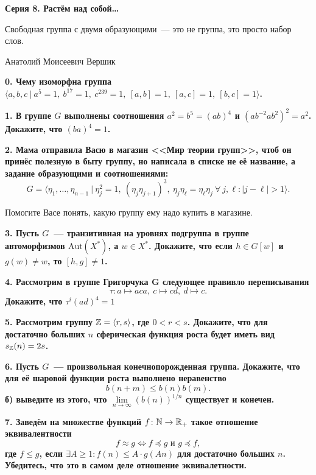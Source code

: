 \documentclass[12pt, oneside, dvipsnames]{extarticle}
\begin{document}
	\begin{center}
	\centerline{\bf{Серия 8.  Растём над собой\ldots }}
	\end{center}

	\epigraph{Свободная группа с двумя образующими~--- это не группа, это просто набор слов.}{Анатолий Моисеевич Вершик}

	\bf{0.} Чему изоморфна группа $\langle a, b, c \ \vert \ a^{5} = 1, \ b^{17} = 1, \ c^{239} = 1, \ [a, b] = 1, \ [a, c] = 1 , \ [b, c] = 1 \rangle$.

	\bf{1.} В группе $G$ выполнены соотношения $a^2 = b^5 = (ab)^4$ и $(a b^{-2} a b^2)^2 = a^2$. Докажите, что $(ba)^4 = 1$. 

	\bf{2.}  Мама отправила Васю в магазин <<Мир теории групп>>, чтоб он принёс полезную в быту группу, но написала в списке не её название, а задание образующими и соотношениями:
	\[
		G = \langle \eta_1, \ldots, \eta_{n - 1} \ \vert \ \eta_j^2 = 1, \ (\eta_j \eta_{j + 1})^3, \ \eta_j \eta_{\ell} = \eta_{\ell} \eta_{j} \ \forall \ j, \ell \colon |j - \ell| > 1 \rangle. 
	\]

	Помогите Васе понять, какую группу ему надо купить в магазине. 

	\bf{3.} Пусть $G$~--- транзитивная на уровнях подгруппа в группе автоморфизмов $\mathrm{Aut}(X^*)$, а $w \in X^*$. Докажите, что если $h \in G[w]$ и $g(w) \neq w$, то $[h, g] \neq 1$. 

	\bf{4.} Рассмотрим в группе Григорчука $\mathbf{G}$ следующее правивло переписывания 
	\[
		\tau\colon a \mapsto a c a, \ c \mapsto c d, \ d \mapsto c.
	\]
	Докажите, что $\tau^i(ad)^4 = 1$
	
	 	
	\bf{5.} Рассмотрим группу $\mathbb{Z} = \langle r, s \rangle$, где $0 < r < s$. Докажите, что для достаточно больших $n$ сферическая функция роста будет иметь вид  $s_{\mathbb{Z}}(n) = 2s$.  

	\bf{6.} Пусть $G$~--- произвольная конечнопорожденная группа. Докажите, что для её шаровой функции роста выполнено неравенство
	\[
	 	b(n + m) \le b(n)b(m).
	 \] 
	 б) выведите из этого, что $\lim\limits_{n \to \infty} (b(n))^{1/n}$ существует и конечен.

	  \bf{7.} Заведём на множестве функций $f\colon \mathbb{N} \to \mathbb{R}_{+}$ такое отношение эквивалентности 
	 \[
	 	f \approx g \Leftrightarrow  f \preceq g \text{ и } g \preceq f,
	 \]
	 где $f \leqslant g$, если $\exists A \ge 1\colon f(n) \le A \cdot g(An)$ для достаточно больших $n$. Убедитесь, что это в самом деле отношение эквивалетности. 
	

	
\end{document}
